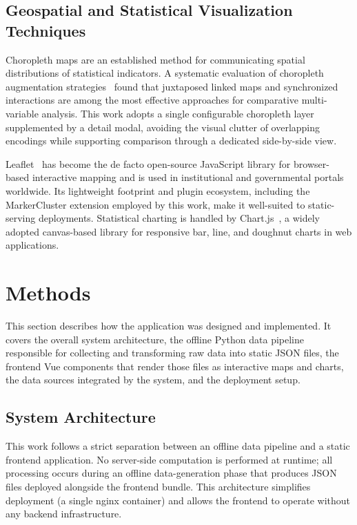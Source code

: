 \documentclass[final,3p,times,twocolumn]{elsarticle}
\begin{document}
\subsection{Geospatial and Statistical Visualization Techniques}

Choropleth maps are an established method for communicating spatial distributions of statistical indicators. A systematic evaluation of choropleth augmentation strategies~\cite{Choropleth2020} found that juxtaposed linked maps and synchronized interactions are among the most effective approaches for comparative multi-variable analysis. This work adopts a single configurable choropleth layer supplemented by a detail modal, avoiding the visual clutter of overlapping encodings while supporting comparison through a dedicated side-by-side view.

Leaflet~\cite{Leaflet} has become the de facto open-source JavaScript library for browser-based interactive mapping and is used in institutional and governmental portals worldwide. Its lightweight footprint and plugin ecosystem, including the MarkerCluster extension employed by this work, make it well-suited to static-serving deployments. Statistical charting is handled by Chart.js~\cite{ChartJS}, a widely adopted canvas-based library for responsive bar, line, and doughnut charts in web applications.

\section{Methods}
\label{sec:methods}

This section describes how the application was designed and implemented. It covers the overall system architecture, the offline Python data pipeline responsible for collecting and transforming raw data into static JSON files, the frontend Vue components that render those files as interactive maps and charts, the data sources integrated by the system, and the deployment setup.

\subsection{System Architecture}

This work follows a strict separation between an offline data pipeline and a static frontend application. No server-side computation is performed at runtime; all processing occurs during an offline data-generation phase that produces JSON files deployed alongside the frontend bundle. This architecture simplifies deployment (a single nginx container) and allows the frontend to operate without any backend infrastructure.
\end{document}
